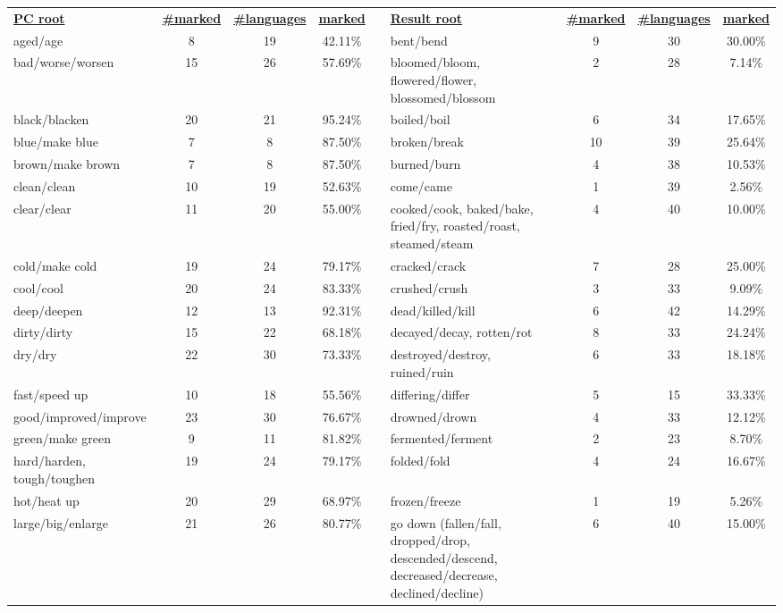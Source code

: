 \begin{tabular}{p{3cm}ccccp{3cm}ccc}
\underline{\textbf{PC root}} & \underline{\textbf{\#marked}} & \underline{\textbf{\#languages}} & \underline{\textbf{marked}} & & \underline{\textbf{Result root}} & \underline{\textbf{\#marked}} & \underline{\textbf{\#languages}} & \underline{\textbf{marked}} \\
aged/age & 8 & 19 & 42.11\% & & bent/bend & 9 & 30 & 30.00\% \\
bad/worse/worsen & 15 & 26 & 57.69\% & & bloomed/bloom, flowered/flower, blossomed/blossom & 2 & 28 & 7.14\% \\
black/blacken & 20 & 21 & 95.24\% & & boiled/boil & 6 & 34 & 17.65\% \\
blue/make blue & 7 & 8 & 87.50\% & & broken/break & 10 & 39 & 25.64\% \\
brown/make brown & 7 & 8 & 87.50\% & & burned/burn & 4 & 38 & 10.53\% \\
clean/clean & 10 & 19 & 52.63\% & & come/came & 1 & 39 & 2.56\% \\
clear/clear & 11 & 20 & 55.00\% & & cooked/cook, baked/bake, fried/fry, roasted/roast, steamed/steam & 4 & 40 & 10.00\% \\
cold/make cold & 19 & 24 & 79.17\% & & cracked/crack & 7 & 28 & 25.00\% \\
cool/cool & 20 & 24 & 83.33\% & & crushed/crush & 3 & 33 & 9.09\% \\
deep/deepen & 12 & 13 & 92.31\% & & dead/killed/kill & 6 & 42 & 14.29\% \\
dirty/dirty & 15 & 22 & 68.18\% & & decayed/decay, rotten/rot & 8 & 33 & 24.24\% \\
dry/dry & 22 & 30 & 73.33\% & & destroyed/destroy, ruined/ruin & 6 & 33 & 18.18\% \\
fast/speed up & 10 & 18 & 55.56\% & & differing/differ & 5 & 15 & 33.33\% \\
good/improved/improve & 23 & 30 & 76.67\% & & drowned/drown & 4 & 33 & 12.12\% \\
green/make green & 9 & 11 & 81.82\% & & fermented/ferment & 2 & 23 & 8.70\% \\
hard/harden, tough/toughen & 19 & 24 & 79.17\% & & folded/fold & 4 & 24 & 16.67\% \\
hot/heat up & 20 & 29 & 68.97\% & & frozen/freeze & 1 & 19 & 5.26\% \\
large/big/enlarge & 21 & 26 & 80.77\% & & go down (fallen/fall, dropped/drop, descended/descend, decreased/decrease, declined/decline) & 6 & 40 & 15.00\% \\

\end{tabular}
